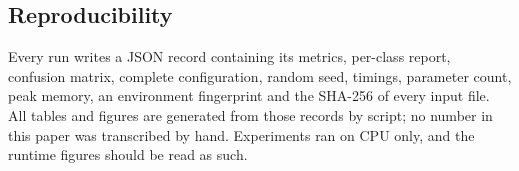 \subsection{Reproducibility}

Every run writes a JSON record containing its metrics, per-class report,
confusion matrix, complete configuration, random seed, timings, parameter
count, peak memory, an environment fingerprint and the SHA-256 of every input
file. All tables and figures are generated from those records by script; no
number in this paper was transcribed by hand. Experiments ran on CPU only, and
the runtime figures should be read as such.
